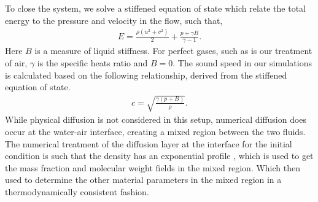 To close the system, we solve a stiffened equation of state which
relate the total energy to the pressure and velocity in the flow, such
that,
% 
\begin{align} \label{eq:stiffened_eos}%
  E=\frac{\rho\left(u^2+v^2\right)}{2} + \frac{p+\gamma B}{\gamma-1}.
\end{align}
%
Here $B$ is a measure of liquid stiffness. For perfect gases, such as
is our treatment of air, $\gamma$ is the specific heats ratio and
$B=0$. The sound speed in our simulations is calculated based on the
following relationship, derived from the stiffened equation of state.
%
\begin{align}
  c = \sqrt{\frac{\gamma\left(p+B\right)}{\rho}}.
\end{align}
%
While physical diffusion is not considered in this setup, numerical
diffusion does occur at the water-air interface, creating a mixed
region between the two fluids. The numerical treatment of the
diffusion layer at the interface for the initial condition is such
that the density has an exponential profile \citep{Latini2007}, which
is used to get the mass fraction and molecular weight fields in the
mixed region. Which then used to determine the other material
parameters in the mixed region in a thermodynamically consistent
fashion.

